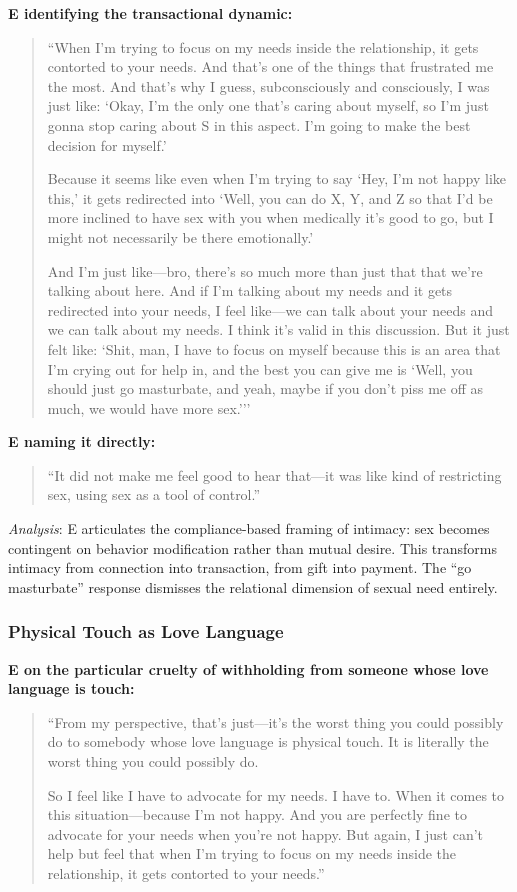 \documentclass[12pt, letterpaper]{article}
\begin{document}
\textbf{E identifying the transactional dynamic:}
\begin{quote}
``When I'm trying to focus on my needs inside the relationship, it gets contorted to your needs. And that's one of the things that frustrated me the most. And that's why I guess, subconsciously and consciously, I was just like: `Okay, I'm the only one that's caring about myself, so I'm just gonna stop caring about S in this aspect. I'm going to make the best decision for myself.'

Because it seems like even when I'm trying to say `Hey, I'm not happy like this,' it gets redirected into `Well, you can do X, Y, and Z so that I'd be more inclined to have sex with you when medically it's good to go, but I might not necessarily be there emotionally.'

And I'm just like---bro, there's so much more than just that that we're talking about here. And if I'm talking about my needs and it gets redirected into your needs, I feel like---we can talk about your needs and we can talk about my needs. I think it's valid in this discussion. But it just felt like: `Shit, man, I have to focus on myself because this is an area that I'm crying out for help in, and the best you can give me is `Well, you should just go masturbate, and yeah, maybe if you don't piss me off as much, we would have more sex.'''
\end{quote}

\textbf{E naming it directly:}
\begin{quote}
``It did not make me feel good to hear that---it was like kind of restricting sex, using sex as a tool of control.''
\end{quote}

\textit{Analysis}: E articulates the compliance-based framing of intimacy: sex becomes contingent on behavior modification rather than mutual desire. This transforms intimacy from connection into transaction, from gift into payment. The ``go masturbate'' response dismisses the relational dimension of sexual need entirely.

\subsubsection{Physical Touch as Love Language}

\textbf{E on the particular cruelty of withholding from someone whose love language is touch:}
\begin{quote}
``From my perspective, that's just---it's the worst thing you could possibly do to somebody whose love language is physical touch. It is literally the worst thing you could possibly do.

So I feel like I have to advocate for my needs. I have to. When it comes to this situation---because I'm not happy. And you are perfectly fine to advocate for your needs when you're not happy. But again, I just can't help but feel that when I'm trying to focus on my needs inside the relationship, it gets contorted to your needs.''
\end{quote}
\end{document}
